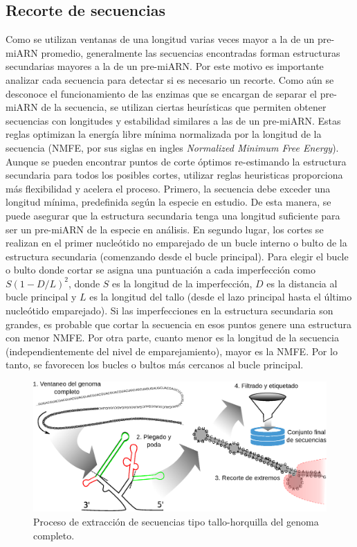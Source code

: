 \subsection{Recorte de secuencias}

Como se utilizan ventanas de una longitud varias veces mayor a la de un pre-miARN promedio, generalmente las secuencias encontradas forman estructuras
secundarias mayores a la de un pre-miARN. Por este motivo es importante analizar cada secuencia para detectar si es necesario un recorte. Como aún se desconoce
el funcionamiento de las enzimas que se encargan de separar el pre-miARN de la secuencia, se utilizan ciertas heurísticas que permiten obtener secuencias con
longitudes y estabilidad similares a las de un pre-miARN. Estas reglas optimizan la energía libre mínima normalizada por la longitud de la secuencia (NMFE, por
sus siglas en ingles \textit{Normalized Minimum Free Energy}). Aunque se pueden encontrar puntos de corte óptimos re-estimando la estructura secundaria para
todos los posibles cortes, utilizar reglas heuristicas proporciona más flexibilidad y acelera el proceso. Primero, la secuencia debe exceder una longitud
mínima, predefinida según la especie en estudio. De esta manera, se puede asegurar que la estructura secundaria tenga una longitud suficiente para ser un
pre-miARN de la especie en análisis. En segundo lugar, los cortes se realizan en el primer nucleótido no emparejado de un bucle interno o bulto de la
estructura secundaria (comenzando desde el bucle principal). Para elegir el bucle o bulto donde cortar se asigna una puntuación a cada imperfección como $ S (1
- D / L) ^ 2 $, donde $ S $ es la longitud de la imperfección, $ D $ es la distancia al bucle principal y $ L $ es la longitud del tallo (desde el lazo
principal hasta el último nucleótido emparejado). Si las imperfecciones en la estructura secundaria son grandes, es probable que cortar la secuencia en esos
puntos genere una estructura con menor NMFE. Por otra parte, cuanto menor es la longitud de la secuencia (independientemente del nivel de emparejamiento), mayor
es la NMFE. Por lo tanto, se favorecen los bucles o bultos más cercanos al bucle principal.

\begin{figure}[t]
	\centering
	\includegraphics[width=\textwidth]{fig/hextractor.eps}
	\caption[Extracción de secuencias tipo tallo-horquilla]{Proceso de extracción de secuencias tipo tallo-horquilla del genoma completo.}
	\label{fig:hextractor}
\end{figure}


